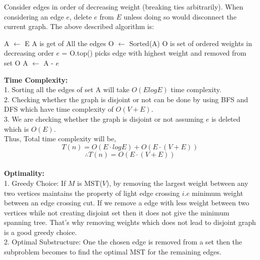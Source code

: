 \documentclass[a4paper,11pt]{article}
\theoremstyle{quest}
\newenvironment{solution}[2][Solution]{\begin{trivlist}
		\item[\hskip \labelsep {\bfseries #1}\hskip \labelsep {\bfseries #2.}]}{\end{trivlist}}
\begin{document}
\begin{solution}2
	Consider edges in order of decreasing weight (breaking ties arbitrarily). When considering an edge	$e$, delete $e$ from $E$ unless doing so would disconnect the current graph.
	The above described algorithm is:
	
	\begin{algorithm}
		\begin{algorithmic}
			\State A $\gets$ E \Comment A is get of All the edges
			\State O $\gets$ Sorted(A)  \Comment O is set of ordered weights in decreasing order
			\State $e$ = O.top() \Comment picks edge with highest weight and removed from set O
			\State A $\gets$ A - $e$
			\EndIf
			\EndWhile
			\EndFunction \\ 	
		\end{algorithmic} 	
	\end{algorithm}
\textbf{Time Complexity:}\\
1. Sorting all the edges of set A will take $O(E log E)$ time complexity.\\
2. Checking whether the graph is disjoint or not can be done by using BFS and DFS which have time complexity of $O(V + E)$.\\
3. We are checking whether the graph is disjoint or not assuming $e$ is deleted which is $O(E)$.\\

Thus, Total time complexity will be,
\begin{equation*}
T(n) = O(E\cdot log E) + O(E\cdot(V+E))
\end{equation*}
\begin{equation*}
 \boxed{\therefore T(n) = O(E \cdot (V+E))}
\end{equation*}\\

\textbf{Optimality:}\\
1. Greedy Choice: If $M$ is MST($V$), by removing the largest weight between any two vertices maintains the property of light edge crossing $i.e$ minimum weight between an edge crossing cut. If we remove a edge with less weight between two vertices while not creating disjoint set then it does not give the minimum spanning tree. That's why removing weights which does not lead to disjoint graph is a good greedy choice.\\
2. Optimal Substructure: One the chosen edge is removed from a set then the subproblem becomes to find the optimal MST for the remaining edges. 
\end{solution} 
\end{document}
